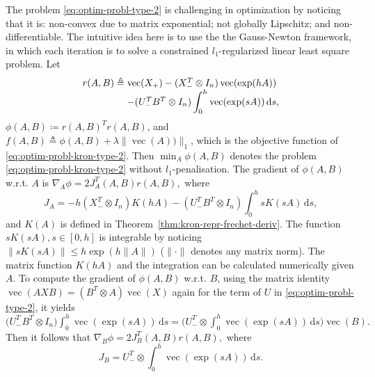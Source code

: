 \documentclass[letterpaper,10pt,journal,final]{IEEEtran}
\theoremstyle{definition}
\theoremstyle{remark}
\newcommand{\kvec}{\operatorname{vec}}
\begin{document}
The problem \eqref{eq:optim-probl-type-2} is challenging in optimization by noticing
that it is: non-convex due to matrix exponential; not globally Lipschitz; and
non-differentiable. The intuitive idea here is to use the the Gauss-Newton framework,
in which each iteration is to solve a constrained $l_1$-regularized linear least
square problem. Let
\begin{equation}
  \label{eq:obj-func-r}
  \begin{array}{l@{\;}l}
    r(A,B) \triangleq &\kvec(X_+) - (X_-^{T} \otimes I_n) \kvec(\exp(hA)) \\
                    &-(U_-^TB^T \otimes I_n) \displaystyle\int_0^h \kvec(\exp(sA))\,\mathrm{d}s,
  \end{array}
\end{equation}
\(\phi(A,B) \coloneqq r(A,B)^T r(A,B)\), and $f(A,B) \triangleq \phi(A,B) + \lambda
\|\kvec(A))\|_1$, which is the objective function of
\eqref{eq:optim-probl-kron-type-2}. Then \(\min_A \phi(A,B)\) denotes the problem
\eqref{eq:optim-probl-kron-type-2} without $l_1$-penalisation. The gradient of
\(\phi(A,B)\) w.r.t. $A$ is
\begin{math}
\nabla_A \phi = 2 J_A^T(A,B) r(A,B),
\end{math}
where
\begin{equation}
  \label{eq:jacobian-J-A}
  J_A = -h (X_-^T \otimes I_n) K(hA) -(U_-^TB^T \otimes I_n) \displaystyle\int_0^h sK(sA)\,\mathrm{d}s,
\end{equation}
and \(K(A)\) is defined in Theorem~\ref{thm:kron-repr-frechet-deriv}. The function
$sK(sA), s\!\in\![0,h]$ is integrable by noticing $\|sK(sA)\| \leq h \exp(h\|A\|)$
($\|\cdot\|$ denotes any matrix norm). The matrix function $K(hA)$ and the
integration can be calculated numerically given $A$.  To compute the gradient of
$\phi(A,B)$ w.r.t. $B$, using the matrix identity $\kvec(AXB) = (B^T \otimes A) \kvec(X)$
again for the term of $U$ in \eqref{eq:optim-probl-type-2}, it yields
\begin{math}
\big(U_-^TB^T \otimes I_n\big) \int_0^h \kvec(\exp(sA))\,\mathrm{d}s
     =
    \big(U_-^T \otimes \int_0^h \kvec(\exp(sA))\,\mathrm{d}s \big) \kvec(B).
\end{math}
Then it follows that
\begin{math}
\nabla_B \phi = 2 J_B^T(A,B) r(A,B),
\end{math}
where
\begin{equation}
  \label{eq:jacobian-J-B}
  J_B = U_-^T \otimes \displaystyle\int_0^h \kvec(\exp(sA))\,\mathrm{d}s.
\end{equation}
\end{document}
